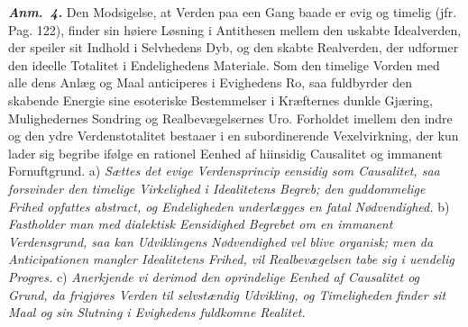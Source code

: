 \documentclass[12pt]{book}
\newcommand{\anm}[1]{\emph{\textbf{Anm.~#1.}}}
\newcommand{\opage}[1]{\marginnote{\footnotesize\textit{[#1]}}}
\begin{document}
\anm{4} Den Modsigelse, at Verden paa een Gang baade er evig og timelig (jfr. Pag. 122),
finder sin høiere Løsning i Antithesen mellem den uskabte Idealverden, der speiler sit
Indhold i Selvhedens Dyb, og den skabte Realverden, der udformer den ideelle Totalitet i
Endelighedens Materiale. Som den timelige Vorden med alle dens Anlæg og Maal anticiperes i
Evighedens Ro, saa fuldbyrder den skabende
\opage{199} %
Energie sine esoteriske Bestemmelser i Kræfternes dunkle Gjæring, Mulighedernes Sondring
og Realbevægelsernes Uro. Forholdet imellem den indre og den ydre Verdenstotalitet
bestaaer i en subordinerende Vexelvirkning, der kun lader sig begribe ifølge en rationel
Eenhed af hiinsidig Causalitet og immanent Fornuftgrund. a) \emph{Sættes det evige
Verdensprincip eensidig som Causalitet, saa forsvinder den timelige Virkelighed i
Idealitetens Begreb; den guddommelige Frihed opfattes abstract, og Endeligheden
underlægges en fatal Nødvendighed.} b) \emph{Fastholder man med dialektisk Eensidighed
Begrebet om en immanent Verdensgrund, saa kan Udviklingens Nødvendighed vel blive
organisk; men da Anticipationen mangler Idealitetens Frihed, vil Realbevægelsen tabe sig i
uendelig Progres.} c) \emph{Anerkjende vi derimod den oprindelige Eenhed af Causalitet og
Grund, da frigjøres Verden til selvstændig Udvikling, og Timeligheden finder sit Maal og
sin Slutning i Evighedens fuldkomne Realitet.}
\end{document}
